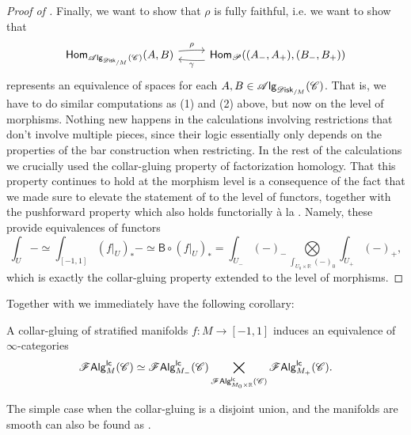 \documentclass[../text]{subfiles}
\begin{document}
\begin{proof}[Proof of ]
    Finally, we want to show that $\rho$ is fully faithful, i.e. we want to show that
    \begin{equation}
        \begin{tikzcd}
            \mathsf{Hom}_{\alg{\disk_{/M}} (\catC)}(A, B) \arrow[r, bend left=4, "\rho"] & \mathsf{Hom}_{\mathscr{P}}((A_-, A_+), (B_-, B_+)) \arrow[l, bend left=4, "\gamma"]
        \end{tikzcd}
    \end{equation}
    represents an equivalence of spaces for each $A, B \in \alg{\disk_{/M}} (\catC)$. That is, we have to do similar computations as (1) and (2) above, but now on the level of morphisms. Nothing new happens in the calculations involving restrictions that don't involve multiple pieces, since their logic essentially only depends on the properties of the bar construction when restricting. In the rest of the calculations we crucially used the collar-gluing property of factorization homology. That this property continues to hold at the morphism level is a consequence of the fact that we made sure to elevate the statement of  to the level of functors, together with the pushforward property which also holds functorially à la . Namely, these provide equivalences of functors
    \begin{equation}
        \int_U - \simeq \int_{[-1,1]} (f|_U)_* - \simeq \mathsf{B} \circ (f|_U)_* = \int_{U_-} (-)_- \bigotimes\limits_{\int_{U_0 \times \mathbb{R}} (-)_0} \int_{U_+} (-)_+,
    \end{equation}
    which is exactly the collar-gluing property extended to the level of morphisms.
\end{proof}

Together with  we immediately have the following corollary:

\begin{corollary}\label{cor:gluing_lcfas}
    A collar-gluing of stratified manifolds $f: M \rightarrow [-1,1]$ induces an equivalence of $\infty$-categories
    \begin{equation}
        \mathscr{F} \mathsf{Alg}^{\mathsf{lc}}_M (\mathscr{C}) \simeq \mathscr{F} \mathsf{Alg}^{\mathsf{lc}}_{M_-} (\mathscr{C}) \bigtimes_{\mathscr{F} \mathsf{Alg}^{\mathsf{lc}}_{M_0 \times \mathbb{R}} (\mathscr{C})} \mathscr{F} \mathsf{Alg}^{\mathsf{lc}}_{M_+}(\mathscr{C}).
    \end{equation}
\end{corollary}

\begin{remark}
    The simple case when the collar-gluing is a disjoint union, and the manifolds are smooth can also be found as \cite[ex.5.4.5.4]{lurie_ha}.
\end{remark}
\end{document}
